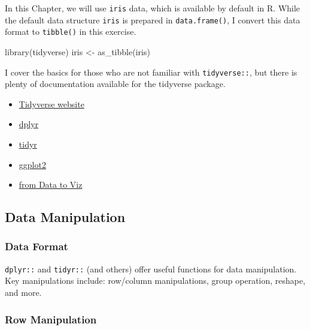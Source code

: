 \documentclass[
]{article}
\newenvironment{Shaded}{\begin{snugshade}}{\end{snugshade}}
\newcommand{\FunctionTok}[1]{\textcolor[rgb]{0.00,0.00,0.00}{#1}}
\newcommand{\NormalTok}[1]{#1}
\newcommand{\OtherTok}[1]{\textcolor[rgb]{0.56,0.35,0.01}{#1}}
\providecommand{\tightlist}{%
  \setlength{\itemsep}{0pt}\setlength{\parskip}{0pt}}
\begin{document}
In this Chapter, we will use \texttt{iris} data, which is available by default in R. While the default data structure \texttt{iris} is prepared in \texttt{data.frame()}, I convert this data format to \texttt{tibble()} in this exercise.

\begin{Shaded}
\begin{Highlighting}[]
\FunctionTok{library}\NormalTok{(tidyverse)}
\NormalTok{iris }\OtherTok{\textless{}{-}} \FunctionTok{as\_tibble}\NormalTok{(iris)}
\end{Highlighting}
\end{Shaded}

I cover the basics for those who are not familiar with \texttt{tidyverse::}, but there is plenty of documentation available for the tidyverse package.

\begin{itemize}
\tightlist
\item
  \href{https://www.tidyverse.org/}{Tidyverse website}
\item
  \href{https://dplyr.tidyverse.org/}{dplyr}
\item
  \href{https://tidyr.tidyverse.org/}{tidyr}
\item
  \href{https://r-graph-gallery.com/ggplot2-package.html}{ggplot2}
\item
  \href{https://www.data-to-viz.com/}{from Data to Viz}
\end{itemize}

\hypertarget{data-manipulation}{%
\subsection{Data Manipulation}\label{data-manipulation}}

\hypertarget{data-format}{%
\subsubsection{Data Format}\label{data-format}}

\texttt{dplyr::} and \texttt{tidyr::} (and others) offer useful functions for data manipulation. Key manipulations include: row/column manipulations, group operation, reshape, and more.

\hypertarget{row-manipulation}{%
\subsubsection{Row Manipulation}\label{row-manipulation}}
\end{document}
